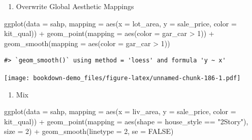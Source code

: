 \documentclass[
]{book}
\newenvironment{Shaded}{\begin{snugshade}}{\end{snugshade}}
\newcommand{\AttributeTok}[1]{\textcolor[rgb]{0.77,0.63,0.00}{#1}}
\newcommand{\ConstantTok}[1]{\textcolor[rgb]{0.00,0.00,0.00}{#1}}
\newcommand{\DecValTok}[1]{\textcolor[rgb]{0.00,0.00,0.81}{#1}}
\newcommand{\FunctionTok}[1]{\textcolor[rgb]{0.00,0.00,0.00}{#1}}
\newcommand{\NormalTok}[1]{#1}
\newcommand{\SpecialCharTok}[1]{\textcolor[rgb]{0.00,0.00,0.00}{#1}}
\newcommand{\StringTok}[1]{\textcolor[rgb]{0.31,0.60,0.02}{#1}}
\providecommand{\tightlist}{%
  \setlength{\itemsep}{0pt}\setlength{\parskip}{0pt}}
\begin{document}
\begin{enumerate}
\def\labelenumi{\arabic{enumi}.}
\setcounter{enumi}{1}
\tightlist
\item
  Overwrite Global Aesthetic Mappings
\end{enumerate}

\begin{Shaded}
\begin{Highlighting}[]
\FunctionTok{ggplot}\NormalTok{(}\AttributeTok{data =}\NormalTok{ sahp, }\AttributeTok{mapping =} \FunctionTok{aes}\NormalTok{(}\AttributeTok{x =}\NormalTok{ lot\_area, }\AttributeTok{y =}\NormalTok{ sale\_price, }\AttributeTok{color =}\NormalTok{ kit\_qual)) }\SpecialCharTok{+} \FunctionTok{geom\_point}\NormalTok{(}\AttributeTok{mapping =} \FunctionTok{aes}\NormalTok{(}\AttributeTok{color =}\NormalTok{ gar\_car }\SpecialCharTok{\textgreater{}} \DecValTok{1}\NormalTok{)) }\SpecialCharTok{+} \FunctionTok{geom\_smooth}\NormalTok{(}\AttributeTok{mapping =} \FunctionTok{aes}\NormalTok{(}\AttributeTok{color =}\NormalTok{ gar\_car }\SpecialCharTok{\textgreater{}} \DecValTok{1}\NormalTok{))}
\end{Highlighting}
\end{Shaded}

\begin{verbatim}
#> `geom_smooth()` using method = 'loess' and formula 'y ~ x'
\end{verbatim}

\texttt{[image: bookdown-demo\_files/figure-latex/unnamed-chunk-186-1.pdf]}

\begin{enumerate}
\def\labelenumi{\arabic{enumi}.}
\setcounter{enumi}{2}
\tightlist
\item
  Mix
\end{enumerate}

\begin{Shaded}
\begin{Highlighting}[]
\FunctionTok{ggplot}\NormalTok{(}\AttributeTok{data =}\NormalTok{ sahp, }\AttributeTok{mapping =} \FunctionTok{aes}\NormalTok{(}\AttributeTok{x =}\NormalTok{ liv\_area, }\AttributeTok{y =}\NormalTok{ sale\_price, }\AttributeTok{color =}\NormalTok{ kit\_qual)) }\SpecialCharTok{+} \FunctionTok{geom\_point}\NormalTok{(}\AttributeTok{mapping =} \FunctionTok{aes}\NormalTok{(}\AttributeTok{shape =}\NormalTok{ house\_style }\SpecialCharTok{==} \StringTok{"2Story"}\NormalTok{), }\AttributeTok{size =} \DecValTok{2}\NormalTok{) }\SpecialCharTok{+} \FunctionTok{geom\_smooth}\NormalTok{(}\AttributeTok{linetype =} \DecValTok{2}\NormalTok{, }\AttributeTok{se =} \ConstantTok{FALSE}\NormalTok{)}
\end{Highlighting}
\end{Shaded}
\end{document}
